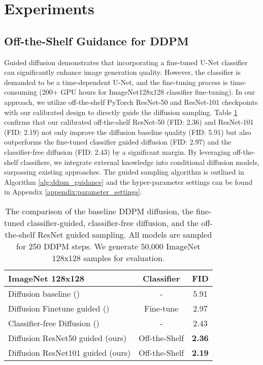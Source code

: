 \documentclass{article}
\theoremstyle{definition}
\begin{document}
\section{Experiments}
\subsection{Off-the-Shelf Guidance for DDPM}
Guided diffusion \citep{dhariwal2021diffusion} demonstrates that incorporating a fine-tuned U-Net classifier can significantly enhance image generation quality. However, the classifier is demanded to be a time-dependent U-Net, and the fine-tuning process is time-consuming (200+ GPU hours for ImageNet128x128 classifier fine-tuning). In our approach, we utilize off-the-shelf PyTorch ResNet-50 and ResNet-101 checkpoints with our calibrated design to directly guide the diffusion sampling. Table \ref{table:guided_diffusion_results} confirms that our calibrated off-the-shelf ResNet-50 (FID: 2.36) and ResNet-101 (FID: 2.19) not only improve the diffusion baseline quality (FID: 5.91) but also outperforms the fine-tuned classifier guided diffusion (FID: 2.97) and the classifier-free diffusion \citep{ho2022classifier} (FID: 2.43) by a significant margin. 
By leveraging off-the-shelf classifiers, we integrate external knowledge into conditional diffusion models, surpassing existing approaches.
The guided sampling algorithm is outlined in Algorithm \ref{alg:ddpm_guidance} and the hyper-parameter settings can be found in Appendix \ref{appendix:parameter_settings}. 

\begin{table}[h!]
\caption{The comparison of the baseline DDPM diffusion, the fine-tuned classifier-guided, classifier-free diffusion, and the off-the-shelf ResNet guided sampling. All models are sampled for 250 DDPM steps. We generate 50,000 ImageNet 128x128 samples for evaluation.}
\label{table:guided_diffusion_results}
\begin{center}
\begin{small}
\begin{sc}
\begin{tabular}{lcc}
\toprule
ImageNet 128x128 & Classifier& FID  \\
\midrule
Diffusion baseline (\cite{dhariwal2021diffusion})  & - & 5.91 \\
Diffusion Finetune guided (\cite{dhariwal2021diffusion})  & Fine-tune &  2.97  \\
Classifier-free Diffusion (\cite{ho2022classifier})  & - &  2.43  \\
Diffusion  ResNet50 guided (ours) & Off-the-Shelf & \bf{2.36} \\
Diffusion  ResNet101 guided (ours) & Off-the-Shelf & \bf{2.19} \\

\bottomrule
\end{tabular}
\end{sc}
\end{small}
\end{center}
\end{table}
\end{document}
